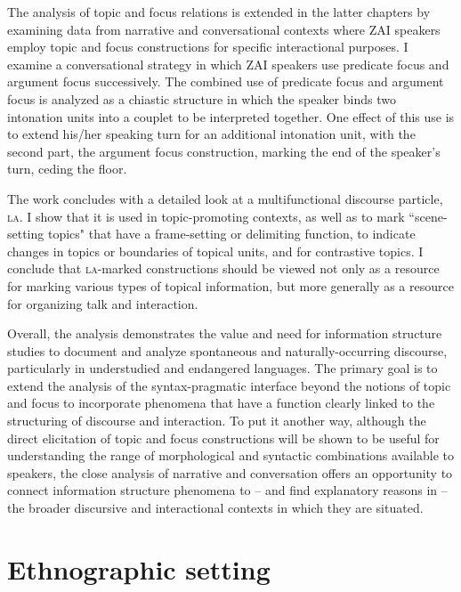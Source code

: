 The analysis of topic and focus relations is extended in the latter chapters by examining data from narrative and conversational contexts where ZAI speakers employ topic and focus constructions for specific interactional purposes. I examine a conversational strategy in which ZAI speakers use predicate focus and argument focus successively. The combined use of predicate focus and argument focus is analyzed as a chiastic structure in which the speaker binds two intonation units into a couplet to be interpreted together. One effect of this use is to extend his/her speaking turn for an additional intonation unit, with the second part, the argument focus construction, marking the end of the speaker's turn, ceding the floor. 

The work concludes with a detailed look at a multifunctional discourse particle, \textsc{la}. I show that it is used in topic-promoting contexts, as well as to mark ``scene-setting topics" that have a frame-setting or delimiting function, to indicate changes in topics or boundaries of topical units, and for contrastive topics. I conclude that \textsc{la}-marked constructions should be viewed not only as a resource for marking various types of topical information, but more generally as a resource for organizing talk and interaction. 

Overall, the analysis demonstrates the value and need for information structure studies to document and analyze spontaneous and naturally-occurring discourse, particularly in understudied and endangered languages.  The primary goal is to extend the analysis of the syntax-pragmatic interface beyond the notions of topic and focus to incorporate phenomena that have a function clearly linked to the structuring of discourse and interaction. To put it another way, although the direct elicitation of topic and focus constructions will be shown to be useful for understanding the range of morphological and syntactic combinations available to speakers, the close analysis of narrative and conversation offers an opportunity to connect information structure phenomena to -- and find explanatory reasons in -- the broader discursive and interactional contexts in which they are situated.


\section{Ethnographic setting}

